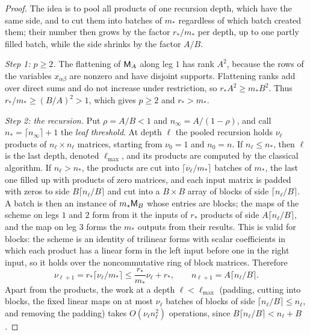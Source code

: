 \begin{proof}
The idea is to pool all products of one recursion depth, which have the
same side, and to cut them into batches of \(m_*\) regardless of which
batch created them; their number then grows by the factor \(r_*/m_*\) per
depth, up to one partly filled batch, while the side shrinks by the factor
\(A/B\).

\emph{Step 1: \(p\ge2\).} The flattening of \(\mathsf M_A\) along leg \(1\) has
rank \(A^2\), because the rows of the variables \(x_{\alpha\beta}\) are
nonzero and have disjoint supports. Flattening ranks add over direct sums
and do not increase under restriction, so \(r_*A^2\ge m_*B^2\). Thus
\(r_*/m_*\ge(B/A)^2>1\), which gives \(p\ge2\) and \(r_*>m_*\).

\emph{Step 2: the recursion.} Put \(\rho=A/B<1\) and
\(n_\infty=A/(1-\rho)\), and call \(n_*=\lceil n_\infty\rceil+1\) the
\emph{leaf threshold}. At depth \(\ell\) the pooled recursion holds
\(\nu_\ell\) products of \(n_\ell\times n_\ell\) matrices, starting from
\(\nu_0=1\) and \(n_0=n\). If \(n_\ell\le n_*\), then \(\ell\) is the last
depth, denoted \(\ell_{\max}\), and its products are computed by the
classical algorithm. If \(n_\ell>n_*\), the products are cut into
\(\lceil\nu_\ell/m_*\rceil\) batches of \(m_*\), the last one filled up
with products of zero matrices, and each input matrix is padded with zeros
to side \(B\lceil n_\ell/B\rceil\) and cut into a \(B\times B\) array of
blocks of side \(\lceil n_\ell/B\rceil\). A batch is then an instance of
\(m_*\mathsf M_B\) whose entries are blocks; the maps of the scheme on legs \(1\)
and \(2\) form from it the inputs of \(r_*\) products of side
\(A\lceil n_\ell/B\rceil\), and the map on leg \(3\) forms the \(m_*\)
outputs from their results. This is valid for blocks: the scheme is an
identity of trilinear forms with scalar coefficients in which each product
has a linear form in the left input before one in the right input, so it
holds over the noncommutative ring of block matrices. Therefore
\begin{equation}\label{eq:pooled-recurrence}
 \nu_{\ell+1}=r_*\lceil\nu_\ell/m_*\rceil
 \le\frac{r_*}{m_*}\nu_\ell+r_*,
 \qquad
 n_{\ell+1}=A\lceil n_\ell/B\rceil .
\end{equation}
Apart from the products, the work at a depth \(\ell<\ell_{\max}\)
(padding, cutting into blocks, the fixed linear maps on at most
\(\nu_\ell\) batches of blocks of side \(\lceil n_\ell/B\rceil\le n_\ell\),
and removing the padding) takes \(O(\nu_\ell n_\ell^2)\) operations, since
\(B\lceil n_\ell/B\rceil<n_\ell+B\).


\end{proof}
